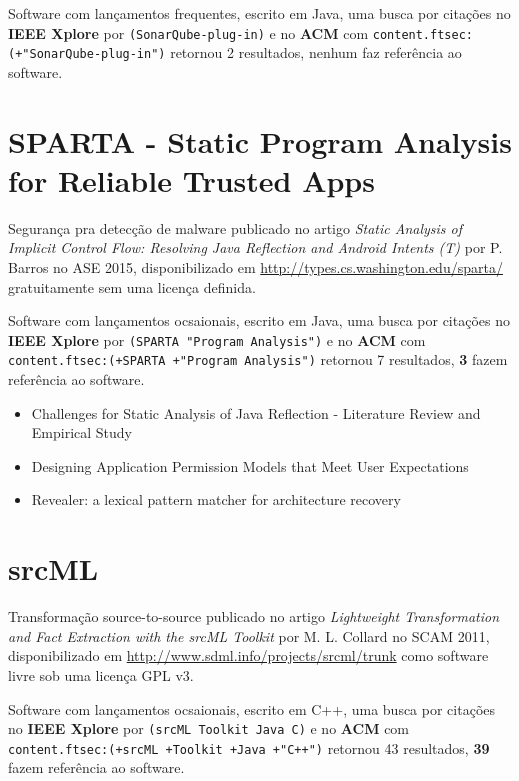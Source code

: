 Software com lançamentos frequentes,
escrito em Java,
uma busca por citações no {\bf IEEE Xplore} por
\texttt{(SonarQube-plug-in)}
e no {\bf ACM} com
\texttt{content.ftsec:(+"SonarQube-plug-in")}
retornou
2 resultados,
nenhum faz referência ao software.



\section{SPARTA - Static Program Analysis for Reliable Trusted Apps}

Segurança pra detecção de malware
publicado no artigo {\it Static Analysis of Implicit Control Flow: Resolving Java Reflection and Android Intents (T)}
por P. Barros
no ASE 2015,
disponibilizado em \url{http://types.cs.washington.edu/sparta/}
gratuitamente
sem uma licença definida.

Software com lançamentos ocsaionais,
escrito em Java,
uma busca por citações no {\bf IEEE Xplore} por
\texttt{(SPARTA "Program Analysis")}
e no {\bf ACM} com
\texttt{content.ftsec:(+SPARTA +"Program Analysis")}
retornou
7 resultados,
{\bf 3} fazem referência ao software.

\begin{itemize}
\item Challenges for Static Analysis of Java Reflection - Literature Review and Empirical Study
\item Designing Application Permission Models that Meet User Expectations
\item Revealer: a lexical pattern matcher for architecture recovery
\end{itemize}


\section{srcML}

Transformação source-to-source
publicado no artigo {\it Lightweight Transformation and Fact Extraction with the srcML Toolkit}
por M. L. Collard
no SCAM 2011,
disponibilizado em \url{http://www.sdml.info/projects/srcml/trunk}
como software livre
sob uma licença GPL v3.

Software com lançamentos ocsaionais,
escrito em C++,
uma busca por citações no {\bf IEEE Xplore} por
\texttt{(srcML Toolkit Java C)}
e no {\bf ACM} com
\texttt{content.ftsec:(+srcML +Toolkit +Java +"C++")}
retornou
43 resultados,
{\bf 39} fazem referência ao software.

